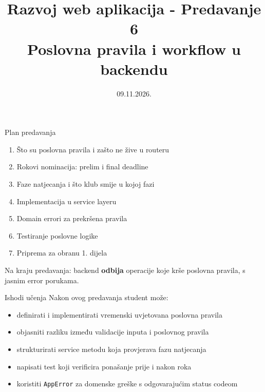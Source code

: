 

\title[Razvoj web aplikacija]{Razvoj web aplikacija - Predavanje 6 \\ Poslovna pravila i workflow u backendu}
\date{09.11.2026.}



\frame{\titlepage}

\begin{frame}{Plan predavanja}
\begin{enumerate}
  \item Što su poslovna pravila i zašto ne žive u routeru
  \item Rokovi nominacija: prelim i final deadline
  \item Faze natjecanja i što klub smije u kojoj fazi
  \item Implementacija u service layeru
  \item Domain errori za prekršena pravila
  \item Testiranje poslovne logike
  \item Priprema za obranu 1. dijela
\end{enumerate}

\vspace{0.6em}
Na kraju predavanja: backend \textbf{odbija} operacije koje krše poslovna pravila, s jasnim error porukama.
\end{frame}

\begin{frame}{Ishodi učenja}
Nakon ovog predavanja student može:
\begin{itemize}
  \item definirati i implementirati vremenski uvjetovana poslovna pravila
  \item objasniti razliku između validacije inputa i poslovnog pravila
  \item strukturirati service metodu koja provjerava fazu natjecanja
  \item napisati test koji verificira ponašanje prije i nakon roka
  \item koristiti \texttt{AppError} za domenske greške s odgovarajućim status codeom
\end{itemize}
\end{frame}

